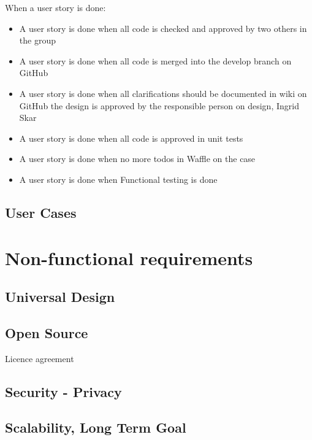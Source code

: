 \begin{description}
    \item[When a user story is done:]
\end{description}
\begin{itemize}[noitemsep]
    \item A user story is done when all code is checked and approved by two others in the group
    \item A user story is done when all code is merged into the develop branch on GitHub
    \item A user story is done when all clarifications should be documented in wiki on GitHub
the design is approved by the responsible person on design, Ingrid Skar
    \item A user story is done when all code is approved in unit tests
    \item A user story is done when no more todos in Waffle on the case
    \item A user story is done when Functional testing is done
\end{itemize}


\subsection{User Cases}
\label{User cases}

\section{Non-functional requirements}
\subsection{Universal Design}
\label{universalDesign}

\subsection{Open Source}
Licence agreement

\subsection{Security - Privacy}

\subsection{Scalability, Long Term Goal}



\cleardoublepage
